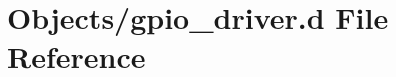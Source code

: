 \hypertarget{gpio__driver_8d}{}\section{Objects/gpio\+\_\+driver.d File Reference}
\label{gpio__driver_8d}
